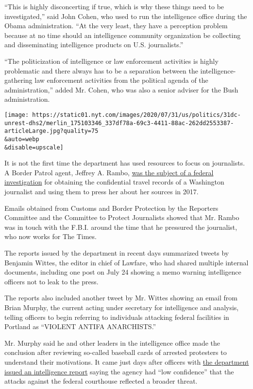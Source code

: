 ``This is highly disconcerting if true, which is why these things need
to be investigated,'' said John Cohen, who used to run the intelligence
office during the Obama administration. ``At the very least, they have a
perception problem because at no time should an intelligence community
organization be collecting and disseminating intelligence products on
U.S. journalists.''

``The politicization of intelligence or law enforcement activities is
highly problematic and there always has to be a separation between the
intelligence-gathering law enforcement activities from the political
agenda of the administration,'' added Mr. Cohen, who was also a senior
adviser for the Bush administration.

\texttt{[image: https://static01.nyt.com/images/2020/07/31/us/politics/31dc-unrest-dhs2/merlin\_175103346\_337df78a-69c3-4411-88ac-262dd2553387-articleLarge.jpg?quality=75\\\&auto=webp\\\&disable=upscale]}

It is not the first time the department has used resources to focus on
journalists. A Border Patrol agent, Jeffrey A. Rambo,
\href{https://www.nytimes.com/2018/07/12/business/jeffrey-rambo-james-wolfe-leaks.html}{was
the subject of a federal investigation} for obtaining the confidential
travel records of a Washington journalist and using them to press her
about her sources in 2017.

Emails obtained from Customs and Border Protection by the Reporters
Committee and the Committee to Protect Journalists showed that Mr. Rambo
was in touch with the F.B.I. around the time that he pressured the
journalist, who now works for The Times.

The reports issued by the department in recent days summarized tweets by
Benjamin Wittes, the editor in chief of Lawfare, who had shared multiple
internal documents, including one post on July 24 showing a memo warning
intelligence officers not to leak to the press.

The reports also included another tweet by Mr. Wittes showing an email
from Brian Murphy, the current acting under secretary for intelligence
and analysis, telling officers to begin referring to individuals
attacking federal facilities in Portland as ``VIOLENT ANTIFA
ANARCHISTS.''

Mr. Murphy said he and other leaders in the intelligence office made the
conclusion after reviewing so-called baseball cards of arrested
protesters to understand their motivations. It came just days after
officers with
\href{https://int.nyt.com/data/documenttools/portland-intelligence-assessment/65e0a41de45b7abc/full.pdf}{the
department issued an intelligence report} saying the agency had ``low
confidence'' that the attacks against the federal courthouse reflected a
broader threat.

